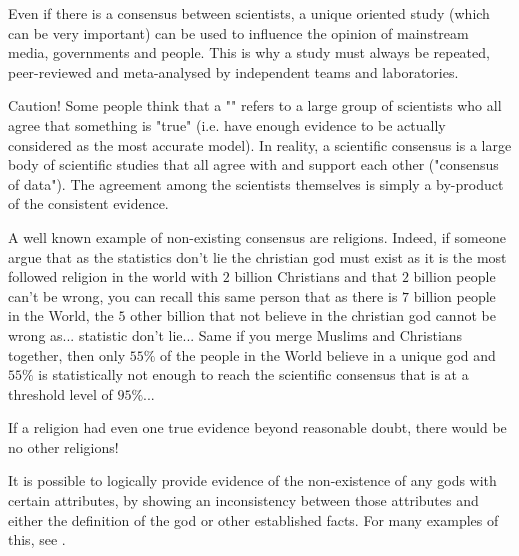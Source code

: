 	\begin{tcolorbox}[title=Remark,arc=10pt,breakable,drop lifted shadow,
  skin=enhanced,
  skin first is subskin of={enhancedfirst}{arc=10pt,no shadow},
  skin middle is subskin of={enhancedmiddle}{arc=10pt,no shadow},
  skin last is subskin of={enhancedlast}{drop lifted shadow}]
	Even if there is a consensus between scientists, a unique oriented study (which can be very important) can be used to influence the opinion of mainstream media, governments and people. This is why a study must always be repeated, peer-reviewed and meta-analysed by independent teams and laboratories.
	\end{tcolorbox}
	
	\begin{tcolorbox}[enhanced,colback=red!5!white,colframe=black!50!red,boxrule=1pt,arc=0pt,outer arc=0pt,drop lifted shadow,after skip=10pt plus 2pt]
	\bcbombe Caution! Some people think that a "" refers to a large group of scientists who all agree that something is "true" (i.e. have enough evidence to be actually considered as the most accurate model). In reality, a scientific consensus is a large body of scientific studies that all agree with and support each other ("consensus of data"). The agreement among the scientists themselves is simply a by-product of the consistent evidence.
	\end{tcolorbox}
	
	A well known example of non-existing consensus are religions. Indeed, if someone argue that as the statistics don't lie the christian god must exist as it is the most followed religion in the world with $2$ billion Christians and that $2$ billion people can't be wrong, you can recall this same person that as there is $7$ billion people in the World, the $5$ other billion that not believe in the christian god cannot be wrong as... statistic don't lie... Same if you merge Muslims and Christians together, then only $55\%$ of the people in the World believe in a unique god and $55\%$ is statistically not enough to reach the scientific consensus that is at a threshold level of $95\%$...
	
	\begin{fquote}If a religion had even one true evidence beyond reasonable doubt, there would be no other religions!
 	\end{fquote}
	
	\begin{tcolorbox}[title=Remark,arc=10pt,breakable,drop lifted shadow,
  skin=enhanced,
  skin first is subskin of={enhancedfirst}{arc=10pt,no shadow},
  skin middle is subskin of={enhancedmiddle}{arc=10pt,no shadow},
  skin last is subskin of={enhancedlast}{drop lifted shadow}]
	It is possible to logically provide evidence of the non-existence of any gods with certain attributes, by showing an inconsistency between those attributes and either the definition of the god or other established facts. For many examples of this, see  \cite{martin2003impossibility}.
	\end{tcolorbox}
	
